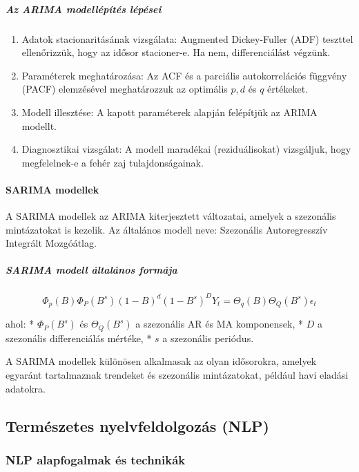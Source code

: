 \documentclass[11pt]{article}
\providecommand{\tightlist}{%
      \setlength{\itemsep}{0pt}\setlength{\parskip}{0pt}}
\begin{document}
\subparagraph{Az ARIMA modellépítés
lépései}\label{az-arima-modelluxe9puxedtuxe9s-luxe9puxe9sei}

\begin{enumerate}
\def\labelenumi{\arabic{enumi}.}
\tightlist
\item
  Adatok stacionaritásának vizsgálata: Augmented Dickey-Fuller (ADF)
  teszttel ellenőrizzük, hogy az idősor stacioner-e. Ha nem,
  differenciálást végzünk.
\item
  Paraméterek meghatározása: Az ACF és a parciális autokorrelációs
  függvény (PACF) elemzésével meghatározzuk az optimális \(p, d\) és
  \(q\) értékeket.
\item
  Modell illesztése: A kapott paraméterek alapján felépítjük az ARIMA
  modellt.
\item
  Diagnosztikai vizsgálat: A modell maradékai (reziduálisokat)
  vizsgáljuk, hogy megfelelnek-e a fehér zaj tulajdonságainak.
\end{enumerate}

\paragraph{SARIMA modellek}\label{sarima-modellek}

A SARIMA modellek az ARIMA kiterjesztett változatai, amelyek a
szezonális mintázatokat is kezelik. Az általános modell neve: Szezonális
Autoregresszív Integrált Mozgóátlag.

\subparagraph{SARIMA modell általános
formája}\label{sarima-modell-uxe1ltaluxe1nos-formuxe1ja}

\[\Phi_p(B)\Phi_P(B^s)(1 - B)^d(1 - B^s)^DY_t = \Theta_q(B)\Theta_Q(B^s)\epsilon_t\]

ahol: * \(\Phi_P(B^s)\) és \(\Theta_Q(B^s)\) a szezonális AR és MA
komponensek, * \(D\) a szezonális differenciálás mértéke, * \(s\) a
szezonális periódus.

A SARIMA modellek különösen alkalmasak az olyan idősorokra, amelyek
egyaránt tartalmaznak trendeket és szezonális mintázatokat, például havi
eladási adatokra.

    \subsection{Természetes nyelvfeldolgozás
(NLP)}\label{termuxe9szetes-nyelvfeldolgozuxe1s-nlp}

\subsubsection{NLP alapfogalmak és
technikák}\label{nlp-alapfogalmak-uxe9s-technikuxe1k}
\end{document}
